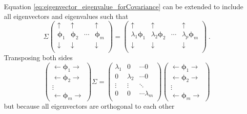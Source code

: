 \documentclass[12pt]{report}
\newcommand{\vectGreek}[1]{\boldsymbol{#1}}
\newcommand{\matr}[1]{\mathsf{#1}}
\begin{document}
Equation \eqref{eq:eigenvector_eigenvalue_forCovariance} can be extended to include all eigenvectors and eigenvalues such that
\begin{equation}
\matr{\Sigma}
	\begin{pmatrix}
		\uparrow & \uparrow & & \uparrow \\
		\vectGreek{\phi}_1 & \vectGreek{\phi}_2 &\cdots& \vectGreek{\phi}_m \\
		\downarrow & \downarrow & & \downarrow \\
	\end{pmatrix}
=
	\begin{pmatrix}
		\uparrow & \uparrow & & \uparrow \\
		\lambda_1\vectGreek{\phi}_1 & \lambda_2\vectGreek{\phi}_2 &\cdots& \lambda_p\vectGreek{\phi}_m \\
		\downarrow & \downarrow & & \downarrow \\
	\end{pmatrix} \ .
\end{equation}
Transposing both sides
\begin{equation*}
\begin{pmatrix}
	\leftarrow\vectGreek{\phi}_1\rightarrow \\
	\leftarrow\vectGreek{\phi}_2\rightarrow \\
	\vdots \\
	\leftarrow\vectGreek{\phi}_m\rightarrow
\end{pmatrix}
\matr{\Sigma}
=
\begin{pmatrix}
	\lambda_1 & 0 & \cdots 0 \\
	0 & \lambda_2 & \cdots 0 \\
	\vdots & \vdots & \ddots \\
	0 & 0 & \cdots \lambda_m \\
\end{pmatrix}
\begin{pmatrix}
	\leftarrow\vectGreek{\phi}_1\rightarrow \\
	\leftarrow\vectGreek{\phi}_2\rightarrow \\
	\vdots \\
	\leftarrow\vectGreek{\phi}_m\rightarrow
\end{pmatrix}
\end{equation*}
but because all eigenvectors are orthogonal to each other
\end{document}
